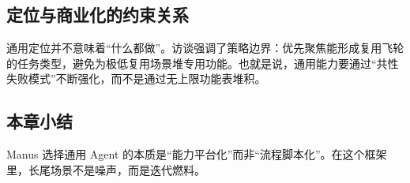 \subsection{定位与商业化的约束关系}

通用定位并不意味着“什么都做”。访谈强调了策略边界：优先聚焦能形成复用飞轮的任务类型，避免为极低复用场景堆专用功能。也就是说，通用能力要通过“共性失败模式”不断强化，而不是通过无上限功能表堆积。

\subsection{本章小结}

Manus 选择通用 Agent 的本质是“能力平台化”而非“流程脚本化”。在这个框架里，长尾场景不是噪声，而是迭代燃料。


